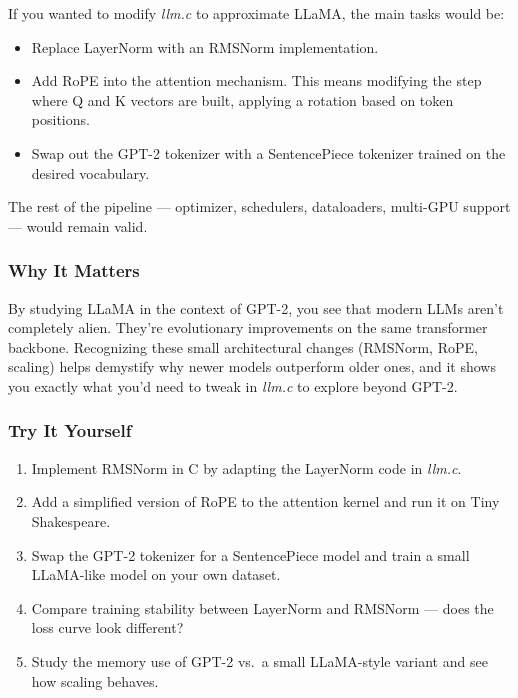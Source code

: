 \documentclass[
  letterpaper,
  DIV=11,
  numbers=noendperiod]{scrreprt}
\providecommand{\tightlist}{%
  \setlength{\itemsep}{0pt}\setlength{\parskip}{0pt}}
\begin{document}
If you wanted to modify \emph{llm.c} to approximate LLaMA, the main
tasks would be:

\begin{itemize}
\tightlist
\item
  Replace LayerNorm with an RMSNorm implementation.
\item
  Add RoPE into the attention mechanism. This means modifying the step
  where Q and K vectors are built, applying a rotation based on token
  positions.
\item
  Swap out the GPT-2 tokenizer with a SentencePiece tokenizer trained on
  the desired vocabulary.
\end{itemize}

The rest of the pipeline --- optimizer, schedulers, dataloaders,
multi-GPU support --- would remain valid.

\subsubsection{Why It Matters}\label{why-it-matters-62}

By studying LLaMA in the context of GPT-2, you see that modern LLMs
aren't completely alien. They're evolutionary improvements on the same
transformer backbone. Recognizing these small architectural changes
(RMSNorm, RoPE, scaling) helps demystify why newer models outperform
older ones, and it shows you exactly what you'd need to tweak in
\emph{llm.c} to explore beyond GPT-2.

\subsubsection{Try It Yourself}\label{try-it-yourself-76}

\begin{enumerate}
\def\labelenumi{\arabic{enumi}.}
\tightlist
\item
  Implement RMSNorm in C by adapting the LayerNorm code in \emph{llm.c}.
\item
  Add a simplified version of RoPE to the attention kernel and run it on
  Tiny Shakespeare.
\item
  Swap the GPT-2 tokenizer for a SentencePiece model and train a small
  LLaMA-like model on your own dataset.
\item
  Compare training stability between LayerNorm and RMSNorm --- does the
  loss curve look different?
\item
  Study the memory use of GPT-2 vs.~a small LLaMA-style variant and see
  how scaling behaves.
\end{enumerate}
\end{document}
